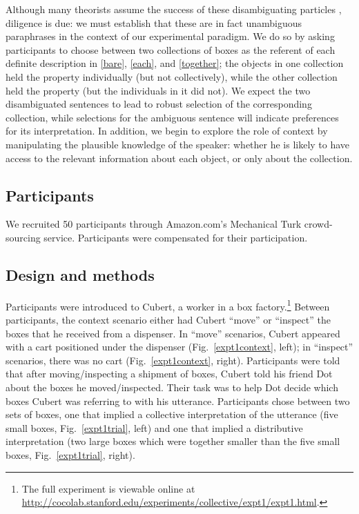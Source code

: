 \documentclass[linguex]{sp}
\begin{document}
Although many theorists assume the success of these disambiguating particles \citep[e.g.,][]{schwarzschild1994}, diligence is due: we must establish that these are in fact unambiguous paraphrases in the context of our experimental paradigm. We do so by asking participants to choose between two collections of boxes as the referent of each definite description in \ref{bare}, \ref{each}, and \ref{together}; the objects in one collection held the property individually (but not collectively), while the other collection held the property (but the individuals in it did not).
We expect the two disambiguated sentences to lead to robust selection of the corresponding collection, while selections for the ambiguous sentence will indicate preferences for its interpretation.
In addition, we begin to explore the role of context by manipulating the plausible knowledge of the speaker: whether he is likely to have access to the relevant information about each object, or only about the collection.

\subsection{Participants}

We recruited 50 participants through Amazon.com's Mechanical Turk crowd-sourcing service. Participants were compensated for their participation.


\subsection{Design and methods}

Participants were introduced to Cubert, a worker in a box factory.\footnote{The full experiment is viewable online at \url{http://cocolab.stanford.edu/experiments/collective/expt1/expt1.html}.} Between participants, the context scenario either had Cubert ``move'' or ``inspect'' the boxes that he received from a dispenser. In ``move'' scenarios, Cubert appeared with a cart positioned under the dispenser (Fig.~\ref{expt1context}, left); in ``inspect'' scenarios, there was no cart (Fig.~\ref{expt1context}, right). Participants were told that after moving/inspecting a shipment of boxes, Cubert told his friend Dot about the boxes he moved/inspected. Their task was to help Dot decide which boxes Cubert was referring to with his utterance. Participants chose between two sets of boxes, one that implied a collective interpretation of the utterance (five small boxes, Fig.\ \ref{expt1trial}, left) and one that implied a distributive interpretation (two large boxes which were together smaller than the five small boxes, Fig.\ \ref{expt1trial}, right).
\end{document}
